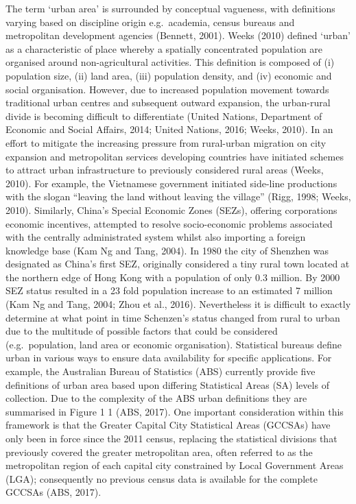 \documentclass[]{book}
\begin{document}
The term `urban area' is surrounded by conceptual vagueness, with
definitions varying based on discipline origin e.g.~academia, census
bureaus and metropolitan development agencies (Bennett, 2001). Weeks
(2010) defined `urban' as a characteristic of place whereby a spatially
concentrated population are organised around non-agricultural
activities. This definition is composed of (i) population size, (ii)
land area, (iii) population density, and (iv) economic and social
organisation. However, due to increased population movement towards
traditional urban centres and subsequent outward expansion, the
urban-rural divide is becoming difficult to differentiate (United
Nations, Department of Economic and Social Affairs, 2014; United
Nations, 2016; Weeks, 2010). In an effort to mitigate the increasing
pressure from rural-urban migration on city expansion and metropolitan
services developing countries have initiated schemes to attract urban
infrastructure to previously considered rural areas (Weeks, 2010). For
example, the Vietnamese government initiated side-line productions with
the slogan ``leaving the land without leaving the village'' (Rigg, 1998;
Weeks, 2010). Similarly, China's Special Economic Zones (SEZs), offering
corporations economic incentives, attempted to resolve socio-economic
problems associated with the centrally administrated system whilst also
importing a foreign knowledge base (Kam Ng and Tang, 2004). In 1980 the
city of Shenzhen was designated as China's first SEZ, originally
considered a tiny rural town located at the northern edge of Hong Kong
with a population of only 0.3 million. By 2000 SEZ status resulted in a
23 fold population increase to an estimated 7 million (Kam Ng and Tang,
2004; Zhou et al., 2016). Nevertheless it is difficult to exactly
determine at what point in time Schenzen's status changed from rural to
urban due to the multitude of possible factors that could be considered
(e.g.~population, land area or economic organisation). Statistical
bureaus define urban in various ways to ensure data availability for
specific applications. For example, the Australian Bureau of Statistics
(ABS) currently provide five definitions of urban area based upon
differing Statistical Areas (SA) levels of collection. Due to the
complexity of the ABS urban definitions they are summarised in Figure 1
1 (ABS, 2017). One important consideration within this framework is that
the Greater Capital City Statistical Areas (GCCSAs) have only been in
force since the 2011 census, replacing the statistical divisions that
previously covered the greater metropolitan area, often referred to as
the metropolitan region of each capital city constrained by Local
Government Areas (LGA); consequently no previous census data is
available for the complete GCCSAs (ABS, 2017).
\end{document}
